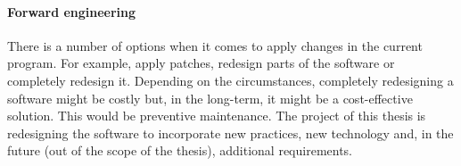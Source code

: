\paragraph{Forward engineering}
There is a number of options when it comes to apply changes in the current program. 
For example, apply patches, redesign parts of the software or completely redesign it.
Depending on the circumstances, completely redesigning a software might be costly but, in the long-term, it might be a cost-effective solution.
This would be preventive maintenance.
The project of this thesis is redesigning the software to incorporate new practices, new technology and, in the future (out of the scope of the thesis), additional requirements.








